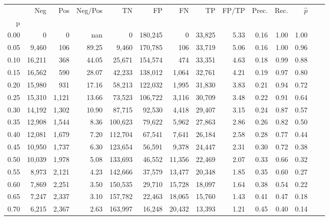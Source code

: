 \begin{tabular}{rrrrrrrrrrrrrr}
\toprule
{} &     Neg &    Pos & Neg/Pos &       TN &       FP &      FN &      TP & FP/TP & Prec. &  Rec. & $\hat{p}$ \\
p    &         &        &         &          &          &         &         &       &       &       &           \\
\midrule
0.00 &       0 &      0 &     nan &        0 &  180,245 &       0 &  33,825 &  5.33 &  0.16 &  1.00 &      1.00 \\
0.05 &   9,460 &    106 &   89.25 &    9,460 &  170,785 &     106 &  33,719 &  5.06 &  0.16 &  1.00 &      0.96 \\
0.10 &  16,211 &    368 &   44.05 &   25,671 &  154,574 &     474 &  33,351 &  4.63 &  0.18 &  0.99 &      0.88 \\
0.15 &  16,562 &    590 &   28.07 &   42,233 &  138,012 &   1,064 &  32,761 &  4.21 &  0.19 &  0.97 &      0.80 \\
0.20 &  15,980 &    931 &   17.16 &   58,213 &  122,032 &   1,995 &  31,830 &  3.83 &  0.21 &  0.94 &      0.72 \\
0.25 &  15,310 &  1,121 &   13.66 &   73,523 &  106,722 &   3,116 &  30,709 &  3.48 &  0.22 &  0.91 &      0.64 \\
0.30 &  14,192 &  1,302 &   10.90 &   87,715 &   92,530 &   4,418 &  29,407 &  3.15 &  0.24 &  0.87 &      0.57 \\
0.35 &  12,908 &  1,544 &    8.36 &  100,623 &   79,622 &   5,962 &  27,863 &  2.86 &  0.26 &  0.82 &      0.50 \\
0.40 &  12,081 &  1,679 &    7.20 &  112,704 &   67,541 &   7,641 &  26,184 &  2.58 &  0.28 &  0.77 &      0.44 \\
0.45 &  10,950 &  1,737 &    6.30 &  123,654 &   56,591 &   9,378 &  24,447 &  2.31 &  0.30 &  0.72 &      0.38 \\
0.50 &  10,039 &  1,978 &    5.08 &  133,693 &   46,552 &  11,356 &  22,469 &  2.07 &  0.33 &  0.66 &      0.32 \\
0.55 &   8,973 &  2,121 &    4.23 &  142,666 &   37,579 &  13,477 &  20,348 &  1.85 &  0.35 &  0.60 &      0.27 \\
0.60 &   7,869 &  2,251 &    3.50 &  150,535 &   29,710 &  15,728 &  18,097 &  1.64 &  0.38 &  0.54 &      0.22 \\
0.65 &   7,247 &  2,337 &    3.10 &  157,782 &   22,463 &  18,065 &  15,760 &  1.43 &  0.41 &  0.47 &      0.18 \\
0.70 &   6,215 &  2,367 &    2.63 &  163,997 &   16,248 &  20,432 &  13,393 &  1.21 &  0.45 &  0.40 &      0.14 \\

\end{tabular}
